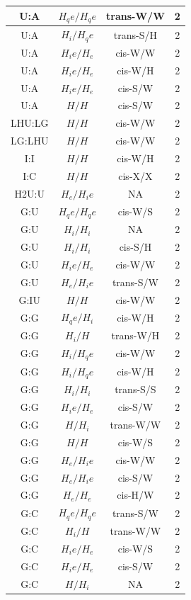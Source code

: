 \begin{center}
\begin{longtable}{c|c|c|c}
U:A & $H_qe/H_qe$ & trans-W/W & 2 \\  \hline
U:A & $H_i/H_qe$ & trans-S/H & 2 \\  \hline
U:A & $H_ie/H_e$ & cis-W/W & 2 \\  \hline
U:A & $H_ie/H_e$ & cis-W/H & 2 \\  \hline
U:A & $H_ie/H_e$ & cis-S/W & 2 \\  \hline
U:A & $H/H$ & cis-S/W & 2 \\  \hline
LHU:LG & $H/H$ & cis-W/W & 2 \\  \hline
LG:LHU & $H/H$ & cis-W/W & 2 \\  \hline
I:I & $H/H$ & cis-W/H & 2 \\  \hline
I:C & $H/H$ & cis-X/X & 2 \\  \hline
H2U:U & $H_e/H_ie$ & NA & 2 \\  \hline
G:U & $H_qe/H_qe$ & cis-W/S & 2 \\  \hline
G:U & $H_i/H_i$ & NA & 2 \\  \hline
G:U & $H_i/H_i$ & cis-S/H & 2 \\  \hline
G:U & $H_ie/H_e$ & cis-W/W & 2 \\  \hline
G:U & $H_e/H_ie$ & trans-S/W & 2 \\  \hline
G:IU & $H/H$ & cis-W/W & 2 \\  \hline
G:G & $H_qe/H_i$ & cis-W/H & 2 \\  \hline
G:G & $H_i/H$ & trans-W/H & 2 \\  \hline
G:G & $H_i/H_qe$ & cis-W/W & 2 \\  \hline
G:G & $H_i/H_qe$ & cis-W/H & 2 \\  \hline
G:G & $H_i/H_i$ & trans-S/S & 2 \\  \hline
G:G & $H_ie/H_e$ & cis-S/W & 2 \\  \hline
G:G & $H/H_i$ & trans-W/W & 2 \\  \hline
G:G & $H/H$ & cis-W/S & 2 \\  \hline
G:G & $H_e/H_ie$ & cis-W/W & 2 \\  \hline
G:G & $H_e/H_ie$ & cis-S/W & 2 \\  \hline
G:G & $H_e/H_e$ & cis-H/W & 2 \\  \hline
G:C & $H_qe/H_qe$ & trans-S/W & 2 \\  \hline
G:C & $H_i/H$ & trans-W/W & 2 \\  \hline
G:C & $H_ie/H_e$ & cis-W/S & 2 \\  \hline
G:C & $H_ie/H_e$ & cis-S/W & 2 \\  \hline
G:C & $H/H_i$ & NA & 2 \\  \hline

\end{longtable}
\end{center}
